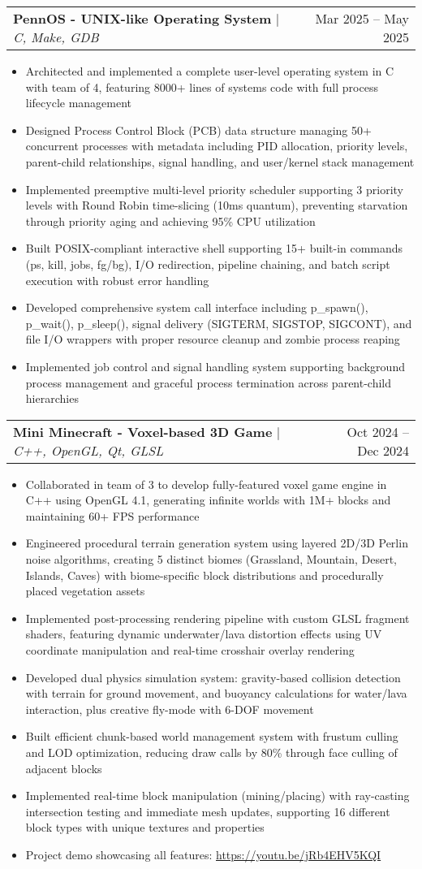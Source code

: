 \documentclass[letterpaper,11pt]{article}
\makeatletter
\newcommand{\resumeItem}[1]{
  \item\small{
    {#1 \vspace{-3pt}}
  }
}
\newcommand{\resumeProjectHeading}[2]{
    \item
    \begin{tabular*}{0.97\textwidth}{l@{\extracolsep{\fill}}r}
      \small#1 & #2 \\
    \end{tabular*}\vspace{-7pt}
}
\newcommand{\resumeItemListStart}{\begin{itemize}}
\newcommand{\resumeItemListEnd}{\end{itemize}\vspace{-5pt}}
\makeatother
\begin{document}
    \resumeProjectHeading
        {\textbf{PennOS - UNIX-like Operating System} $|$ \emph{C, Make, GDB}}{Mar 2025 -- May 2025}
        \resumeItemListStart
        \resumeItem{Architected and implemented a complete user-level operating system in C with team of 4, featuring 8000+ lines of systems code with full process lifecycle management}
        \resumeItem{Designed Process Control Block (PCB) data structure managing 50+ concurrent processes with metadata including PID allocation, priority levels, parent-child relationships, signal handling, and user/kernel stack management}
        \resumeItem{Implemented preemptive multi-level priority scheduler supporting 3 priority levels with Round Robin time-slicing (10ms quantum), preventing starvation through priority aging and achieving 95\% CPU utilization}
        \resumeItem{Built POSIX-compliant interactive shell supporting 15+ built-in commands (ps, kill, jobs, fg/bg), I/O redirection, pipeline chaining, and batch script execution with robust error handling}
        \resumeItem{Developed comprehensive system call interface including p\_spawn(), p\_wait(), p\_sleep(), signal delivery (SIGTERM, SIGSTOP, SIGCONT), and file I/O wrappers with proper resource cleanup and zombie process reaping}
        \resumeItem{Implemented job control and signal handling system supporting background process management and graceful process termination across parent-child hierarchies}
        \resumeItemListEnd
          
    \resumeProjectHeading
          {\textbf{Mini Minecraft - Voxel-based 3D Game} $|$ \emph{C++, OpenGL, Qt, GLSL}}{Oct 2024 -- Dec 2024}
          \resumeItemListStart
          \resumeItem{Collaborated in team of 3 to develop fully-featured voxel game engine in C++ using OpenGL 4.1, generating infinite worlds with 1M+ blocks and maintaining 60+ FPS performance}
          \resumeItem{Engineered procedural terrain generation system using layered 2D/3D Perlin noise algorithms, creating 5 distinct biomes (Grassland, Mountain, Desert, Islands, Caves) with biome-specific block distributions and procedurally placed vegetation assets}
          \resumeItem{Implemented post-processing rendering pipeline with custom GLSL fragment shaders, featuring dynamic underwater/lava distortion effects using UV coordinate manipulation and real-time crosshair overlay rendering}
          \resumeItem{Developed dual physics simulation system: gravity-based collision detection with terrain for ground movement, and buoyancy calculations for water/lava interaction, plus creative fly-mode with 6-DOF movement}
          \resumeItem{Built efficient chunk-based world management system with frustum culling and LOD optimization, reducing draw calls by 80\% through face culling of adjacent blocks}
          \resumeItem{Implemented real-time block manipulation (mining/placing) with ray-casting intersection testing and immediate mesh updates, supporting 16 different block types with unique textures and properties}
          \resumeItem{Project demo showcasing all features: \url{https://youtu.be/jRb4EHV5KQI}}
          \resumeItemListEnd
          
\end{document}

